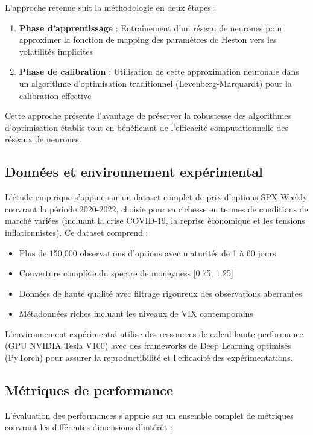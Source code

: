 L'approche retenue suit la méthodologie en deux étapes :

\begin{enumerate}
\item \textbf{Phase d'apprentissage} : Entraînement d'un réseau de neurones pour approximer la fonction de mapping des paramètres de Heston vers les volatilités implicites
\item \textbf{Phase de calibration} : Utilisation de cette approximation neuronale dans un algorithme d'optimisation traditionnel (Levenberg-Marquardt) pour la calibration effective
\end{enumerate}

Cette approche présente l'avantage de préserver la robustesse des algorithmes d'optimisation établis tout en bénéficiant de l'efficacité computationnelle des réseaux de neurones.

\subsection{Données et environnement expérimental}

L'étude empirique s'appuie sur un dataset complet de prix d'options SPX Weekly couvrant la période 2020-2022, choisie pour sa richesse en termes de conditions de marché variées (incluant la crise COVID-19, la reprise économique et les tensions inflationnistes). Ce dataset comprend :

\begin{itemize}
\item Plus de 150,000 observations d'options avec maturités de 1 à 60 jours
\item Couverture complète du spectre de moneyness [0.75, 1.25]
\item Données de haute qualité avec filtrage rigoureux des observations aberrantes
\item Métadonnées riches incluant les niveaux de VIX contemporains
\end{itemize}

L'environnement expérimental utilise des ressources de calcul haute performance (GPU NVIDIA Tesla V100) avec des frameworks de Deep Learning optimisés (PyTorch) pour assurer la reproductibilité et l'efficacité des expérimentations.

\subsection{Métriques de performance}

L'évaluation des performances s'appuie sur un ensemble complet de métriques couvrant les différentes dimensions d'intérêt :

